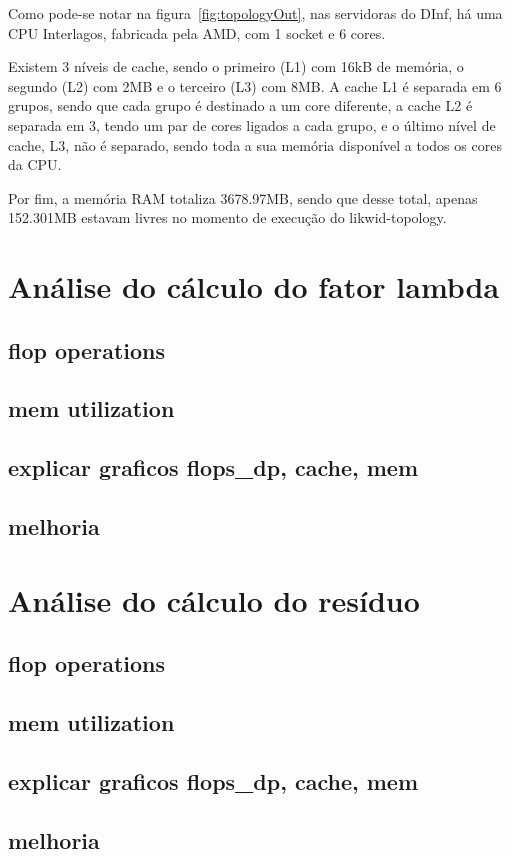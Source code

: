 \documentclass[12pt]{article}
\begin{document}
Como pode-se notar na figura~\ref{fig:topologyOut}, nas servidoras do DInf, há uma CPU Interlagos, fabricada pela AMD, com 1 socket e 6 cores.

Existem 3 níveis de cache, sendo o primeiro (L1) com 16kB de memória, o segundo (L2) com 2MB e o terceiro (L3) com 8MB. A cache L1 é separada em 6 grupos, sendo que cada grupo é destinado a um core diferente, a cache L2 é separada em 3, tendo um par de cores ligados a cada grupo, e o último nível de cache, L3, não é separado, sendo toda a sua memória disponível a todos os cores da CPU.

Por fim, a memória RAM totaliza 3678.97MB, sendo que desse total, apenas 152.301MB estavam livres no momento de execução do likwid-topology.

\section{Análise do cálculo do fator lambda}\label{sec:lambda}
\subsection{flop operations}
\subsection{mem utilization}
\subsection{explicar graficos flops\_dp, cache, mem}
\subsection{melhoria}

\section{Análise do cálculo do resíduo}\label{sec:residuo}
\subsection{flop operations}
\subsection{mem utilization}
\subsection{explicar graficos flops\_dp, cache, mem}
\subsection{melhoria}
\end{document}
